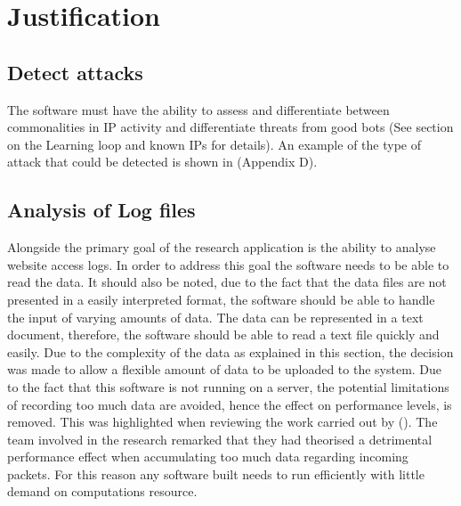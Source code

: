 \section{Justification}

\subsection*{Detect attacks} 

The software must have the ability to assess and differentiate between commonalities in IP activity and differentiate threats from good bots (See section on the Learning loop and known IPs for details). An example of the type of attack that could be detected is shown in (Appendix D).

\subsection*{Analysis of Log files}
Alongside the primary goal of the research application is the ability to analyse website access logs. In order to address this goal the software needs to be able to read the data. It should also be noted, due to the fact that the data files are not presented in a easily interpreted format, the software should be able to handle the input of varying amounts of data. The data can be represented in a text document, therefore, the software should be able to read a text file quickly and easily. Due to the complexity of the data as explained in this section, the decision was made to allow a flexible amount of data to be uploaded to the system. Due to the fact that this software is not running on a server, the potential limitations of recording too much data are avoided, hence the effect on performance levels, is removed. This was highlighted when reviewing the work carried out by \citeauthor{staniford2002practical} (\citeyear{staniford2002practical}). The team involved in the research remarked that they had theorised a detrimental performance effect when accumulating too much data regarding incoming packets. For this reason any software built needs to run efficiently with little demand on computations resource.

